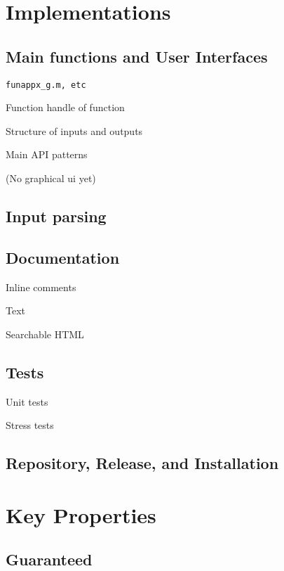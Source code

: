 \documentclass[acmtoms]{doc_acmtrans2m}
\begin{document}
\section{Implementations}
\label{sec:impl}


\subsection{Main functions and User Interfaces} \label{sec:ui}

 \texttt{funappx\_g.m, etc}

 Function handle of function

 Structure of inputs and outputs

 Main API patterns

 (No graphical ui yet)

\subsection{Input parsing}


\subsection{Documentation} \label{sec:doc}

  Inline comments

  Text

  Searchable HTML

\subsection{Tests} \label{sec:tests}


Unit tests

Stress tests


\subsection{Repository, Release, and Installation}


\section{Key Properties}\label{sec:prop}
\subsection{Guaranteed}
\end{document}
